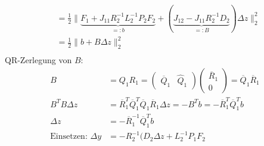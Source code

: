 \begin{itemize}
\begin{align*}
&= \frac 12 \|\underbrace{F_1 + J_{11} R_2^{-1} L_2^{-1} P_2 F_2}_{=\colon b} + (\underbrace{J_{12} - J_{11} R_2^{-1} D_2}_{=\colon B}) \Delta z \|_2^2\\
&= \frac 12 \|b + B \Delta z \|_2^2 \\
\end{align*}
QR-Zerlegung von $B$:
\begin{align*}
B &= Q_1 R_1 = \begin{pmatrix} \overline Q_1 & \hat Q_1 \end{pmatrix} \begin{pmatrix} \overline R_1 \\ 0 \end{pmatrix} = \overline Q_1 \overline R_1 \\
B^T B \Delta z &= \overline R_1^T \overline Q_1^T \overline Q_1 \overline R_1 \Delta z = -B^T b = -\overline R_1^T \overline Q_1^T b \\
\Delta z &= - \overline R_1^{-1} \overline Q_1^T b \\
\text{Einsetzen: } \Delta y &= -R_2^{-1} ( D_2 \Delta z + L_2^{-1} P_1 F_2 \\
\end{align*}
\end{itemize}




